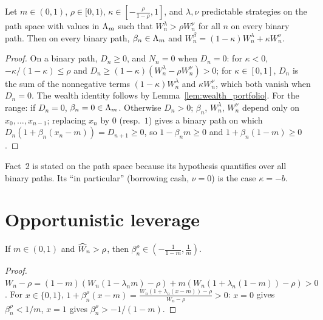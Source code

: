 \begin{lemma}
  \label{fact:short}
  \leanok
  Let $m \in (0,1)$, $\rho \in [0, 1)$, $\kappa \in [-\frac{\rho}{1-\rho}, 1]$, and $\lambda, \nu$
  predictable strategies on the path space with values in $\Lambda_m$ such that $W^\lambda_n > \rho
  W^\nu_n$ for all $n$ on every binary path. Then on every binary path, $\beta_n \in \Lambda_m$ and
  $W^\beta_n = (1-\kappa) W^\lambda_n + \kappa W^\nu_n$.
\end{lemma}

\begin{proof}
  \leanok
  On a binary path, $D_n \ge 0$, and $N_n = 0$ when $D_n = 0$: for
  $\kappa < 0$, $-\kappa/(1-\kappa) \le \rho$ and $D_n \ge (1-\kappa)(W^\lambda_n - \rho W^\nu_n) >
  0$; for $\kappa \in [0, 1]$, $D_n$ is the sum of the nonnegative terms $(1-\kappa)W^\lambda_n$ and
  $\kappa W^\nu_n$, which both vanish when $D_n = 0$. The wealth identity follows by
  Lemma~\ref{lem:wealth_portfolio}. For the range: if $D_n = 0$, $\beta_n = 0 \in \Lambda_m$. Otherwise
  $D_n > 0$; $\beta_n$, $W^\lambda_n$, $W^\nu_n$ depend only on $x_0, \dots, x_{n-1}$; replacing
  $x_n$ by $0$ (resp.\ $1$) gives a binary path on which $D_n (1 + \beta_n(x_n - m)) = D_{n+1} \ge
  0$, so $1 - \beta_n m \ge 0$ and $1 + \beta_n(1-m) \ge 0$.
\end{proof}

\begin{remark}
  Fact~2 is stated on the path space because its hypothesis quantifies over all binary paths. Its
  ``in particular'' (borrowing cash, $\nu = 0$) is the case $\kappa = -b$.
\end{remark}

\section{Opportunistic leverage}

\begin{lemma}[Lemma B.3]
  \label{lem:leverage_valid}
  \leanok
  If $m \in (0,1)$ and $\widehat{W}_n > \rho$, then $\beta^\rho_n \in (-\frac{1}{1-m}, \frac1m)$.
\end{lemma}

\begin{proof}
  \leanok
  $W_n - \rho = (1-m)(W_n(1 - \lambda_n m) - \rho) + m(W_n(1 + \lambda_n(1-m)) - \rho) > 0$. For
  $x \in \{0, 1\}$, $1 + \beta^\rho_n (x - m) = \frac{W_n(1 + \lambda_n(x - m)) - \rho}{W_n - \rho} >
  0$: $x = 0$ gives $\beta^\rho_n < 1/m$, $x = 1$ gives $\beta^\rho_n > -1/(1-m)$.
\end{proof}

